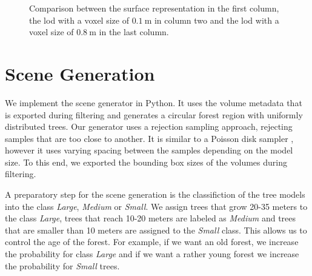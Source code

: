 \begin{figure}[t]
\begin{center}
\begin{minipage}[c]{0.24\textwidth}
        \end{minipage}
    \end{center}
    \caption[Comparison between mesh and volume renderings]{Comparison between the surface representation in the first column, the \ac{lod} with a voxel size of $\SI{0.1}{\m}$ in column two and the \ac{lod} with a voxel size of $\SI{0.8}{\m}$ in the last column.}
    \label{fig:lods_comparison}
\end{figure}

\section{Scene Generation}
\label{sec:scene_generation}
We implement the scene generator in Python.
It uses the volume metadata that is exported during filtering and generates a circular forest region with uniformly distributed trees.
Our generator uses a rejection sampling approach, rejecting samples that are too close to another.
It is similar to a Poisson disk sampler \cite{poisson_sampling}, however it uses varying spacing between the samples depending on the model size.
To this end, we exported the bounding box sizes of the volumes during filtering.

A preparatory step for the scene generation is the classifiction of the tree models into the class \textit{Large}, \textit{Medium} or \textit{Small}.
We assign trees that grow 20-35 meters to the class \textit{Large}, trees that reach 10-20 meters are labeled as \textit{Medium} and trees that are smaller than 10 meters are assigned to the \textit{Small} class.
This allows us to control the age of the forest.
For example, if we want an old forest, we increase the probability for class \textit{Large} and if we want a rather young forest we increase the probability for \textit{Small} trees.

